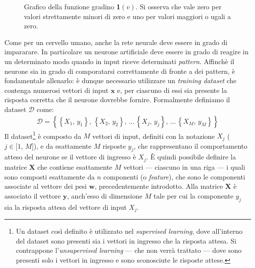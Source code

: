 % 
\begin{figure}[!b]
    \centering
    
    \caption[Grafico della funzione gradino \textsl{1}$(v)$.]{Grafico della funzione gradino \textbf{1}$(v)$. Si osserva che vale zero per valori strettamente minori di zero e uno per valori maggiori o ugali a zero.}\label{fig:step-function}
\end{figure}
% 
\noindent Come per un cervello umano, anche la rete neurale deve essere in grado di impararare. In particolare un neurone artificiale deve essere in grado di reagire in un determinato modo quando in input riceve determinati \textsl{pattern}. Affinchè il neurone sia in grado di comporatarsi correttamente di fronte a dei pattern, è fondamentale allenarlo: è dunque necessario utilizzare un \textit{training dataset} che contenga numerosi vettori di input $\mathbf{x}$ e, per ciascuno di essi sia presente la risposta corretta che il neurone dovrebbe fornire. Formalmente definiamo il dataset $\mathcal{D}$ come:
% 
\begin{gather*}
    \mathcal{D} = \left\{ \left\{ X_1,\, y_1 \right\},\,\left\{ X_2,\, y_2 \right\},\,\dots\,\left\{ X_j,\, y_j \right\},\,\dots\,\left\{ X_M,\, y_M \right\} \right\}  
\end{gather*}
% 
\noindent Il dataset\footnote{Un dataset così definito è utilizzato nel \textit{supervised learning}, dove all'interno del dataset sono presenti sia i vettori in ingresso che la risposta attesa. Si contrappone l'\textit{unsupervised learning} — che non verrà trattato — dove sono presenti solo i vettori in ingresso e sono sconosciute le risposte attese.} è composto da $M$ vettori di input, definiti con la notazione $X_j$ ($j\in[1,\,M$]), e da esattamente $M$ risposte $y_j$, che rappresentano il comportamento atteso del neurone se il vettore di ingresso è $X_j$. È quindi possibile definire la matrice $\mathbf{X}$ che contiene esattamente $M$ vettori — ciascuno in una riga — i quali sono composti esattamente da $n$ componenti (o \textit{feature}), che sono le componenti associate al vettore dei pesi $\mathbf{w}$, precedentemente introdotto. Alla matrice $\mathbf{X}$ è associato il vettore $\mathbf{y}$, anch'esso di dimensione $M$ tale per cui la componente $y_j$ sia la risposta attesa del vettore di input $X_j$.
% 

